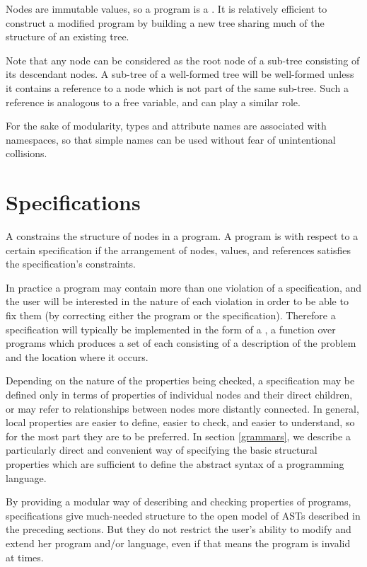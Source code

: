 Nodes are immutable values, so a program is a \cite{sarnak}. It is relatively efficient to construct a modified program by building a new tree sharing much of the structure of an existing tree.

Note that any node can be considered as the root node of a sub-tree consisting of its descendant nodes. A sub-tree of a well-formed tree will be well-formed unless it contains a  reference to a node which is not part of the same sub-tree. Such a reference is analogous to a free variable, and can play a similar role.

For the sake of modularity, types and attribute names are associated with namespaces, so that simple names can be used without fear of unintentional collisions. 


\section{Specifications}
A  constrains the structure of nodes in a program. A program is  with respect to a certain specification if the arrangement of nodes, values, and references satisfies the specification's constraints.

In practice a program may contain more than one violation of a specification, and the user will be interested in the nature of each violation in order to be able to fix them (by correcting either the program or the specification). Therefore a specification will typically be implemented in the form of a , a function over programs which produces a set of  each consisting of a description of the problem and the location where it occurs.

Depending on the nature of the properties being checked, a specification may be defined only in terms of  properties of individual nodes and their direct children, or may refer to  relationships between nodes more distantly connected. In general, local properties are easier to define, easier to check, and easier to understand, so for the most part they are to be preferred. In section \ref{grammars}, we describe a particularly direct and convenient way of specifying the basic structural properties which are sufficient to define the abstract syntax of a programming language.

By providing a modular way of describing and checking properties of programs, specifications give much-needed structure to the open model of ASTs described in the preceding sections. But they do not restrict the user's ability to modify and extend her program and/or language, even if that means the program is invalid at times.


